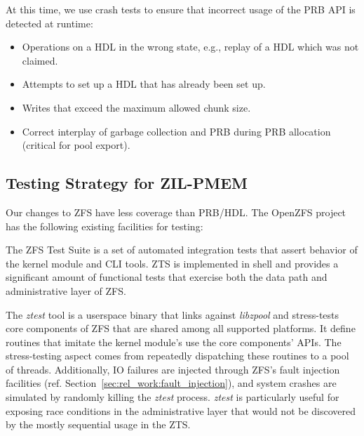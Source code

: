 \documentclass[12pt,a4paper,twoside]{book}
\begin{document}
At this time, we use crash tests to ensure that incorrect usage of the PRB API is detected at runtime:
\begin{itemize}[noitemsep]
    \item Operations on a HDL in the wrong state, e.g., replay of a HDL which was not claimed.
    \item Attempts to set up a HDL that has already been set up.
    \item Writes that exceed the maximum allowed chunk size.
    \item Correct interplay of garbage collection and PRB during PRB allocation (critical for pool export).
\end{itemize}

\subsection{Testing Strategy for ZIL-PMEM}\label{sec:eval:correctness:zilpmem}

Our changes to ZFS have less coverage than PRB/HDL.
The OpenZFS project has the following existing facilities for testing:
\begin{description}[noitemsep]
    \item[ZFS Test Suite (ZTS)] The ZFS Test Suite is a set of automated integration tests that assert behavior of the kernel module and CLI tools.
        ZTS is implemented in shell and provides a significant amount of functional tests that exercise both the data path and administrative layer of ZFS.
    \item[ztest] The \textit{ztest} tool is a userspace binary that links against \textit{libzpool} and stress-tests core components of ZFS that are shared among all supported platforms.
        It define routines that imitate the kernel module's use the core components' APIs.
        The stress-testing aspect comes from repeatedly dispatching these routines to a pool of threads.
        Additionally, IO failures are injected through ZFS's fault injection facilities (ref. Section~\ref{sec:rel_work:fault_injection}), and system crashes are simulated by randomly killing the \textit{ztest} process.
        \textit{ztest} is particularly useful for exposing race conditions in the administrative layer that would not be discovered by the mostly sequential usage in the ZTS.
\end{description}
\end{document}
